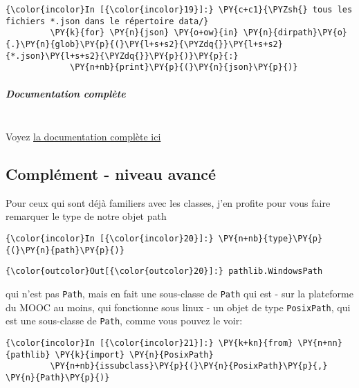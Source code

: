     \begin{Verbatim}[commandchars=\\\{\}]
{\color{incolor}In [{\color{incolor}19}]:} \PY{c+c1}{\PYZsh{} tous les fichiers *.json dans le répertoire data/}
         \PY{k}{for} \PY{n}{json} \PY{o+ow}{in} \PY{n}{dirpath}\PY{o}{.}\PY{n}{glob}\PY{p}{(}\PY{l+s+s2}{\PYZdq{}}\PY{l+s+s2}{*.json}\PY{l+s+s2}{\PYZdq{}}\PY{p}{)}\PY{p}{:}
             \PY{n+nb}{print}\PY{p}{(}\PY{n}{json}\PY{p}{)}
\end{Verbatim}


    \hypertarget{documentation-compluxe8te}{%
\subparagraph{Documentation complète\\\\}\label{documentation-compluxe8te}}

    Voyez \href{https://docs.python.org/3/library/pathlib.html}{la
documentation complète ici}

    \hypertarget{compluxe9ment---niveau-avancuxe9}{%
\subsection{Complément - niveau
avancé}\label{compluxe9ment---niveau-avancuxe9}}

    Pour ceux qui sont déjà familiers avec les classes, j'en profite pour
vous faire remarquer le type de notre objet path

    \begin{Verbatim}[commandchars=\\\{\}]
{\color{incolor}In [{\color{incolor}20}]:} \PY{n+nb}{type}\PY{p}{(}\PY{n}{path}\PY{p}{)}
\end{Verbatim}


\begin{Verbatim}[commandchars=\\\{\}]
{\color{outcolor}Out[{\color{outcolor}20}]:} pathlib.WindowsPath
\end{Verbatim}
            
    qui n'est pas \texttt{Path}, mais en fait une sous-classe de
\texttt{Path} qui est - sur la plateforme du MOOC au moins, qui
fonctionne sous linux - un objet de type \texttt{PosixPath}, qui est une
sous-classe de \texttt{Path}, comme vous pouvez le voir:

    \begin{Verbatim}[commandchars=\\\{\}]
{\color{incolor}In [{\color{incolor}21}]:} \PY{k+kn}{from} \PY{n+nn}{pathlib} \PY{k}{import} \PY{n}{PosixPath}
         \PY{n+nb}{issubclass}\PY{p}{(}\PY{n}{PosixPath}\PY{p}{,} \PY{n}{Path}\PY{p}{)}
\end{Verbatim}


